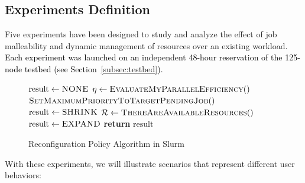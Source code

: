 \documentclass[a4paper,fleqn]{cas-dc}
\newcommand{\mm}[1]{\textcolor{black}{#1}}
\begin{document}
\subsection{Experiments Definition}\label{subsubsec:exps}
Five experiments have been designed to study and analyze the effect of job malleability and dynamic management of resources over an existing workload.
\mm{Each experiment was launched on an independent 48-hour reservation of the 125-node testbed (see Section~\ref{subsec:testbed}).}
\begin{figure}[tbp]
  \centering
  \begin{minipage}{.6\linewidth}
    \begin{algorithm}[H]
        \caption{Reconfiguration Policy Algorithm in Slurm}
        \label{alg:reconf_policy}
        \begin{algorithmic}[1]
            \STATE $\text{result} \gets \textsc{NONE}$
            \STATE $\eta \gets \textsc{EvaluateMyParallelEfficiency}()$
                    \STATE $\textsc{SetMaximumPriorityToTargetPendingJob}()$
                     \STATE $\text{result} \gets \textsc{SHRINK}$
                \ENDIF
            \ELSE
                \STATE $\mathcal{R} \gets \textsc{ThereAreAvailableResources}()$
                        \STATE $\text{result} \gets \textsc{EXPAND}$
                    \ENDIF
                \ENDIF
            \ENDIF
            \STATE \textbf{return} $\text{result}$
        \end{algorithmic}
    \end{algorithm}
  \end{minipage}
\end{figure}
With these experiments, we will illustrate scenarios that represent different user behaviors:
\end{document}
